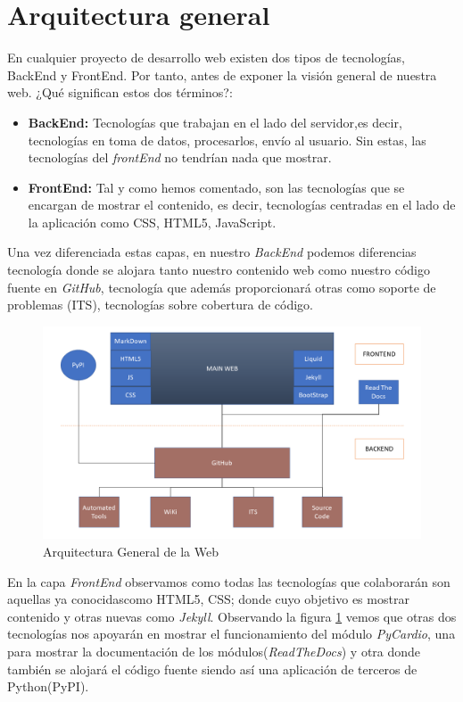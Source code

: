 \documentclass[a4paper, 12pt]{book}
\begin{document}
\section{Arquitectura general}
\label{sec:arqui}
En cualquier proyecto de desarrollo web existen dos tipos de tecnologías, BackEnd y FrontEnd. Por tanto, antes de exponer la visión general de nuestra web. ¿Qué significan estos dos términos?:
\begin{itemize}
    \item \textbf{BackEnd:} Tecnologías que trabajan en el lado del servidor,es decir, tecnologías en toma de datos, procesarlos, envío al usuario. Sin estas, las tecnologías del \emph{frontEnd} no tendrían nada que mostrar.
    \item \textbf{FrontEnd:} Tal y como hemos comentado, son las tecnologías que se encargan de mostrar el contenido, es decir, tecnologías centradas en el lado de la aplicación como CSS, HTML5, JavaScript.
\end{itemize}
Una vez diferenciada estas capas, en nuestro \emph{BackEnd} podemos diferencias tecnología donde se alojara tanto nuestro contenido web como nuestro código fuente en \emph{GitHub}, tecnología que además proporcionará otras como soporte de problemas (ITS), tecnologías sobre cobertura de código. \\
\begin{figure}[h]
    \centering
    \includegraphics[width=\textwidth]{img/arqui_general.png}
    \caption{Arquitectura General de la Web}
    \label{fig:arquiGeneral}
\end{figure}
En la capa \emph{FrontEnd} observamos como todas las tecnologías que colaborarán son aquellas ya conocidascomo HTML5, CSS; donde cuyo objetivo es mostrar contenido y otras nuevas como \emph{Jekyll}. Observando la figura \ref{fig:arquiGeneral} vemos que otras dos tecnologías nos apoyarán en mostrar el funcionamiento del módulo \emph{PyCardio}, una para mostrar la documentación de los módulos(\emph{ReadTheDocs}) y otra donde también se alojará el código fuente siendo así una aplicación de terceros de Python(PyPI).
\end{document}
